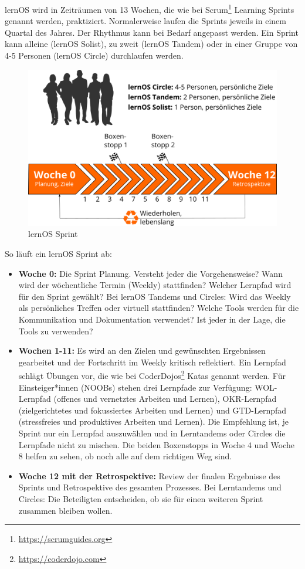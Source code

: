 \documentclass[
  ngerman,
  paper=a4,
,captions=tableheading
]{scrartcl}
\DeclareRobustCommand{\href}[2]{#2\footnote{\url{#1}}}
\providecommand{\tightlist}{%
  \setlength{\itemsep}{0pt}\setlength{\parskip}{0pt}}
\begin{document}
lernOS wird in Zeiträumen von 13 Wochen, die wie bei
\href{https://scrumguides.org}{Scrum} Learning Sprints genannt werden,
praktiziert. Normalerweise laufen die Sprints jeweils in einem Quartal
des Jahres. Der Rhythmus kann bei Bedarf angepasst werden. Ein Sprint
kann alleine (lernOS Solist), zu zweit (lernOS Tandem) oder in einer
Gruppe von 4-5 Personen (lernOS Circle) durchlaufen werden.

\begin{figure}
\centering
\includegraphics{./tex2pdf.-c0ed5a8631023970/80c28d15a479ebb119ba5c36bcbcf681c76609a4.png}
\caption{lernOS Sprint}
\end{figure}

So läuft ein lernOS Sprint ab:

\begin{itemize}
\tightlist
\item
  \textbf{Woche 0:} Die Sprint Planung. Versteht jeder die
  Vorgehensweise? Wann wird der wöchentliche Termin (Weekly)
  stattfinden? Welcher Lernpfad wird für den Sprint gewählt? Bei lernOS
  Tandems und Circles: Wird das Weekly als persönliches Treffen oder
  virtuell stattfinden? Welche Tools werden für die Kommunikation und
  Dokumentation verwendet? Ist jeder in der Lage, die Tools zu
  verwenden?
\item
  \textbf{Wochen 1-11:} Es wird an den Zielen und gewünschten
  Ergebnissen gearbeitet und der Fortschritt im Weekly kritisch
  reflektiert. Ein Lernpfad schlägt Übungen vor, die wie bei
  \href{https://coderdojo.com}{CoderDojos} Katas genannt werden. Für
  Einsteiger*innen (NOOBs) stehen drei Lernpfade zur Verfügung:
  WOL-Lernpfad (offenes und vernetztes Arbeiten und Lernen),
  OKR-Lernpfad (zielgerichtetes und fokussiertes Arbeiten und Lernen)
  und GTD-Lernpfad (stressfreies und produktives Arbeiten und Lernen).
  Die Empfehlung ist, je Sprint nur ein Lernpfad auszuwählen und in
  Lerntandems oder Circles die Lernpfade nicht zu mischen. Die beiden
  Boxenstopps in Woche 4 und Woche 8 helfen zu sehen, ob noch alle auf
  dem richtigen Weg sind.
\item
  \textbf{Woche 12 mit der Retrospektive:} Review der finalen Ergebnisse
  des Sprints und Retrospektive des gesamten Prozesses. Bei Lerntandems
  und Circles: Die Beteiligten entscheiden, ob sie für einen weiteren
  Sprint zusammen bleiben wollen.
\end{itemize}
\end{document}
